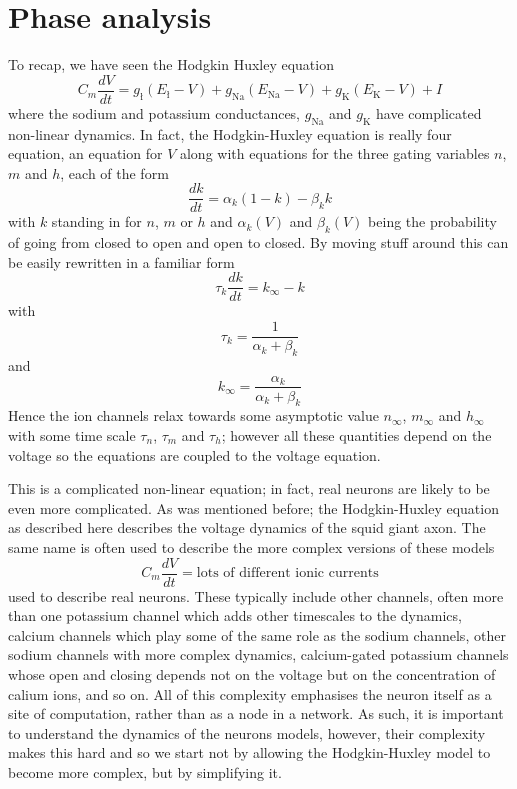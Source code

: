 \documentclass[11pt,a4paper]{scrartcl}
\begin{document}
\section*{Phase analysis}
To recap, we have seen the Hodgkin Huxley equation
\begin{equation}
C_m\frac{dV}{dt}=g_{\text{\l}}(E_{\text{\l}}-V)+g_{\text{Na}}(E_{\text{Na}}-V)+g_{\text{K}}(E_{\text{K}}-V)+I
\end{equation}
where the sodium and potassium conductances, $g_{\text{Na}}$ and
$g_{\text{K}}$ have complicated non-linear dynamics. In fact, the
Hodgkin-Huxley equation is really four equation, an equation for $V$
along with equations for the three gating variables $n$, $m$ and $h$, each of the form
\begin{equation}
\frac{dk}{dt}=\alpha_k(1-k)-\beta_k k
\end{equation}
with $k$ standing in for $n$, $m$ or $h$ and $\alpha_k(V)$ and $\beta_k(V)$
being the probability of going from closed to open and open to
closed. By moving stuff around this can be easily rewritten in a familiar form
\begin{equation}
\tau_k\frac{dk}{dt}=k_\infty - k
\end{equation}
with 
\begin{equation}
\tau_k=\frac{1}{\alpha_k+\beta_k}
\end{equation}
and
\begin{equation}
k_\infty=\frac{\alpha_k}{\alpha_k+\beta_k}
\end{equation}
Hence the ion channels relax towards some asymptotic value $n_\infty$,
$m_\infty$ and $h_\infty$ with some time scale $\tau_n$, $\tau_m$ and
$\tau_h$; however all these quantities depend on the voltage so the
equations are coupled to the voltage equation.

This is a complicated non-linear equation; in fact, real neurons are
likely to be even more complicated. As was mentioned before; the
Hodgkin-Huxley equation as described here describes the voltage
dynamics of the squid giant axon. The same name is often used to
describe the more complex versions of these models
\begin{equation}
C_m\frac{dV}{dt}=\mbox{lots of different ionic currents}
\end{equation}
used to describe real neurons. These typically include other channels,
often more than one potassium channel which adds other timescales to
the dynamics, calcium channels which play some of the same role as the
sodium channels, other sodium channels with more complex dynamics,
calcium-gated potassium channels whose open and closing depends not on
the voltage but on the concentration of calium ions, and so on. All of
this complexity emphasises the neuron itself as a site of computation,
rather than as a node in a network. As such, it is important to
understand the dynamics of the neurons models, however, their
complexity makes this hard and so we start not by allowing the
Hodgkin-Huxley model to become more complex, but by simplifying it.
\end{document}
